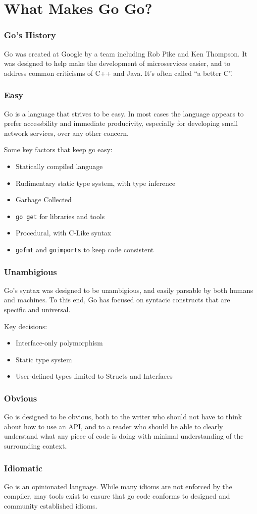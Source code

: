 \documentclass{beamer}
\begin{document}
\section{What Makes Go Go?}
\begin{frame}
  \frametitle{Go's History}
  Go was created at Google by a team including Rob Pike and Ken
  Thompson.  It was designed to help make the development of
  microservices easier, and to address common criticisms of C++ and
  Java.  It's often called ``a better C''.
\end{frame}

\begin{frame}
  \frametitle{Easy}
  Go is a language that strives to be easy.  In most cases the
  language appears to prefer accessbility and immediate producivity,
  especially for developing small network services, over any other
  concern.

  Some key factors that keep go easy:
  \begin{itemize}
  \item Statically compiled language
  \item Rudimentary static type system, with type inference
  \item Garbage Collected
  \item {\tt go get} for libraries and tools
  \item Procedural, with C-Like syntax
  \item {\tt gofmt} and {\tt goimports} to keep code consistent
  \end{itemize}
\end{frame}

\begin{frame}
  \frametitle{Unambigious}
  Go's syntax was designed to be unambigious, and easily parsable by
  both humans and machines.  To this end, Go has focused on syntacic
  constructs that are specific and universal.

  Key decisions:
  \begin{itemize}
    \item Interface-only polymorphism
    \item Static type system
    \item User-defined types limited to Structs and Interfaces
  \end{itemize}
\end{frame}
\begin{frame}
  \frametitle{Obvious}
  Go is designed to be obvious, both to the writer who should not have
  to think about how to use an API, and to a reader who should be able
  to clearly understand what any piece of code is doing with minimal
  understanding of the surrounding context.
\end{frame}
\begin{frame}
  \frametitle{Idiomatic}
  Go is an opinionated language.  While many idioms are not enforced
  by the compiler, may tools exist to ensure that go code conforms to
  designed and community established idioms.
\end{frame}
\end{document}
